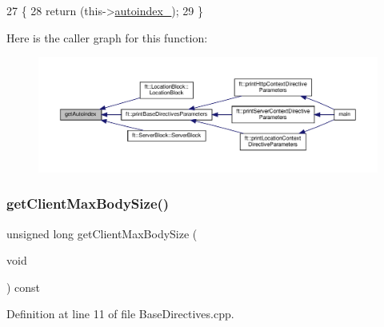 \begin{DoxyCode}
27     \{
28         \textcolor{keywordflow}{return} (this->\hyperlink{classft_1_1_base_directives_a4ebffbe32f50a462afa139c6f03c1a4f}{autoindex\_});
29     \}
\end{DoxyCode}
Here is the caller graph for this function\+:
\nopagebreak
\begin{figure}[H]
\begin{center}
\leavevmode
\includegraphics[width=350pt]{classft_1_1_base_directives_a4c11ed7ad76aeac228b029a2444de568_icgraph}
\end{center}
\end{figure}
\mbox{\label{classft_1_1_base_directives_a930398ba1e4b99b2ba01a60dcda0c923}} 
\subsubsection{\texorpdfstring{get\+Client\+Max\+Body\+Size()}{getClientMaxBodySize()}}
{\footnotesize\ttfamily unsigned long get\+Client\+Max\+Body\+Size (\begin{DoxyParamCaption}\item[{void}]{ }\end{DoxyParamCaption}) const}



Definition at line 11 of file Base\+Directives.\+cpp.


